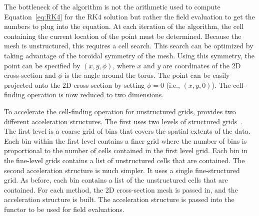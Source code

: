 The bottleneck of the algorithm is not the arithmetic used to compute Equation~\ref{eq:RK4} for the RK4 solution but rather the field evaluation to get the numbers to plug into the equation.
At each iteration of the algorithm, the cell containing the current location of the point must be determined. Because the mesh is unstructured, this requires a cell search. This search can be optimized by taking advantage of the toroidal symmetry of the mesh.
Using this symmetry, the point can be specified by $(x,y,\phi)$, where $x$ and $y$ are coordinates of the 2D cross-section and $\phi$ is the angle around the torus. The point can be easily projected onto the 2D cross section by setting $\phi = 0$ (i.e., $(x,y,0)$).
The cell-finding operation is now reduced to two dimensions.

To accelerate the cell-finding operation for unstructured grids, \vtkm provides two different acceleration structures. The first uses two levels of structured grids~\cite{Kalojanov2011}. The first level is a coarse grid of bins that covers the spatial extents of the data. Each bin within the first level contains a finer grid where the number of bins is proportional to the number of cells contained in the first level grid. Each bin in the fine-level grids contains a list of unstructured cells that are contained.
The second acceleration structure is much simpler. It uses a single fine-structured grid. As before, each bin contains a list of the unstructured cells that are contained.
For each method, the 2D cross-section mesh is passed in, and the acceleration structure is built. The acceleration structure is passed into the \vtkm functor to be used for field evaluations.

